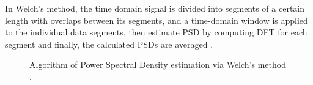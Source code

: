 In Welch's method, the time domain signal is divided into segments of a certain length with overlaps between its segments, and a time-domain window is applied to the individual data segments, then estimate PSD by computing DFT for each segment and finally, the calculated PSDs are averaged \cite{jwo2021windowing,stoica2005spectral,schmid2012use}.

\begin{figure}[!h]
	\centering
	\vspace{1cm}
	\caption{Algorithm of Power Spectral Density estimation via Welch's method \cite{solomon1991psd}.}	
	\label{welch}
\end{figure}

